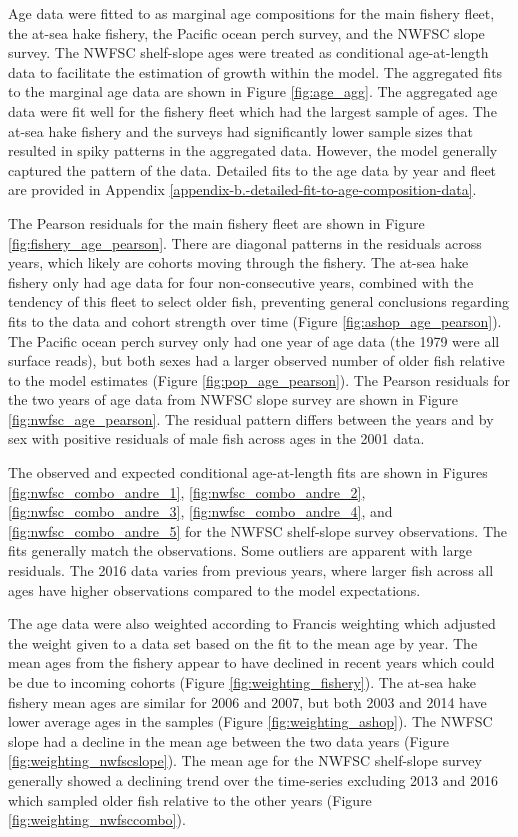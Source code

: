 \documentclass[12pt,]{article}
\begin{document}
Age data were fitted to as marginal age compositions for the main
fishery fleet, the at-sea hake fishery, the Pacific ocean perch survey,
and the NWFSC slope survey. The NWFSC shelf-slope ages were treated as
conditional age-at-length data to facilitate the estimation of growth
within the model. The aggregated fits to the marginal age data are shown
in Figure \ref{fig:age_agg}. The aggregated age data were fit well for
the fishery fleet which had the largest sample of ages. The at-sea hake
fishery and the surveys had significantly lower sample sizes that
resulted in spiky patterns in the aggregated data. However, the model
generally captured the pattern of the data. Detailed fits to the age
data by year and fleet are provided in Appendix
\ref{appendix-b.-detailed-fit-to-age-composition-data}.

The Pearson residuals for the main fishery fleet are shown in Figure
\ref{fig:fishery_age_pearson}. There are diagonal patterns in the
residuals across years, which likely are cohorts moving through the
fishery. The at-sea hake fishery only had age data for four
non-consecutive years, combined with the tendency of this fleet to
select older fish, preventing general conclusions regarding fits to the
data and cohort strength over time (Figure \ref{fig:ashop_age_pearson}).
The Pacific ocean perch survey only had one year of age data (the 1979
were all surface reads), but both sexes had a larger observed number of
older fish relative to the model estimates (Figure
\ref{fig:pop_age_pearson}). The Pearson residuals for the two years of
age data from NWFSC slope survey are shown in Figure
\ref{fig:nwfsc_age_pearson}. The residual pattern differs between the
years and by sex with positive residuals of male fish across ages in the
2001 data.

The observed and expected conditional age-at-length fits are shown in
Figures \ref{fig:nwfsc_combo_andre_1}, \ref{fig:nwfsc_combo_andre_2},
\ref{fig:nwfsc_combo_andre_3}, \ref{fig:nwfsc_combo_andre_4}, and
\ref{fig:nwfsc_combo_andre_5} for the NWFSC shelf-slope survey
observations. The fits generally match the observations. Some outliers
are apparent with large residuals. The 2016 data varies from previous
years, where larger fish across all ages have higher observations
compared to the model expectations.

The age data were also weighted according to Francis weighting which
adjusted the weight given to a data set based on the fit to the mean age
by year. The mean ages from the fishery appear to have declined in
recent years which could be due to incoming cohorts (Figure
\ref{fig:weighting_fishery}). The at-sea hake fishery mean ages are
similar for 2006 and 2007, but both 2003 and 2014 have lower average
ages in the samples (Figure \ref{fig:weighting_ashop}). The NWFSC slope
had a decline in the mean age between the two data years (Figure
\ref{fig:weighting_nwfscslope}). The mean age for the NWFSC shelf-slope
survey generally showed a declining trend over the time-series excluding
2013 and 2016 which sampled older fish relative to the other years
(Figure \ref{fig:weighting_nwfsccombo}).
\end{document}
